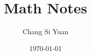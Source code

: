 \documentclass[a4paper]{article}
\author{Chang Si Yuan}
\title{Math Notes}
\date{\today}
\begin{document}
\maketitle

\begin{multicols}{2}






% 

\end{multicols}
\end{document}
